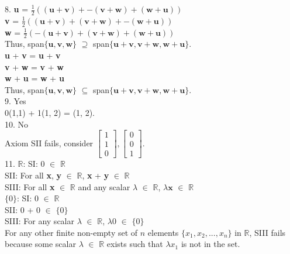 \documentclass{article}
\begin{document}
    8. \textbf{u} = $\frac{1}{2}((\textbf{u} + \textbf{v}) + -(\textbf{v} + \textbf{w}) + (\textbf{w} + \textbf{u}))$\\
    \textbf{v} = $\frac{1}{2}((\textbf{u} + \textbf{v}) + (\textbf{v} + \textbf{w}) + -(\textbf{w} + \textbf{u}))$\\
    \textbf{w} = $\frac{1}{2}(-(\textbf{u} + \textbf{v}) + (\textbf{v} + \textbf{w}) + (\textbf{w} + \textbf{u}))$\\
    Thus, span$\{\textbf{u}, \textbf{v}, \textbf{w}\}$ $\supseteq$ span$\{\textbf{u} + \textbf{v}, \textbf{v} + \textbf{w}, \textbf{w} + \textbf{u}\}$.\\
    \textbf{u} + \textbf{v} = \textbf{u} + \textbf{v}\\
    \textbf{v} + \textbf{w} = \textbf{v} + \textbf{w}\\
    \textbf{w} + \textbf{u} = \textbf{w} + \textbf{u}\\
    Thus, span$\{\textbf{u}, \textbf{v}, \textbf{w}\}$ $\subseteq$ span$\{\textbf{u} + \textbf{v}, \textbf{v} + \textbf{w}, \textbf{w} + \textbf{u}\}$.\\

    9. Yes\\
    0(1,1) + 1(1, 2) = (1, 2).\\

    10. No\\
    Axiom SII fails, consider $\begin{bmatrix} 1 \\ 1\\ 0\end{bmatrix}, \begin{bmatrix} 0 \\ 0\\ 1\end{bmatrix}$.\\

    11. $\mathbb{R}$: SI: 0 $\in$ $\mathbb{R}$\\
    SII: For all \textbf{x}, \textbf{y} $\in$ $\mathbb{R}$, \textbf{x} + \textbf{y} $\in$ $\mathbb{R}$\\
    SIII: For all \textbf{x} $\in$ $\mathbb{R}$ and any scalar $\lambda$ $\in$ $\mathbb{R}$, $\lambda\textbf{x}$ $\in$ $\mathbb{R}$\\
  $\{0\}$: SI: 0 $\in$ $\mathbb{R}$\\
    SII: 0 + 0 $\in$ $\{0\}$\\
    SIII: For any scalar $\lambda$ $\in$ $\mathbb{R}$, $\lambda0$ $\in$ $\{0\}$\\
    For any other finite non-empty set of $n$ elements $\{x_1, x_2, ..., x_n\}$ in $\mathbb{R}$, SIII fails because some scalar $\lambda$ $\in$ $\mathbb{R}$ exists such that $\lambda x_1$ is not in the set.
\end{document}
